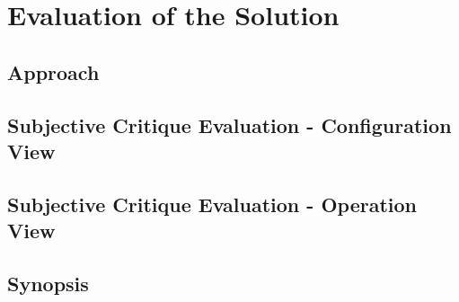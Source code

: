 \chapter{Evaluation of the Solution}
\label{chap:evaluation}

\section{Approach}
\label{sec:evaluation:approach}

\section{Subjective Critique Evaluation - Configuration View}
\label{sec:evaluation:configuration}

\section{Subjective Critique Evaluation - Operation View}
\label{sec:evaluation:operation}

\section{Synopsis}
\label{sec:evaluation:synopsis}
